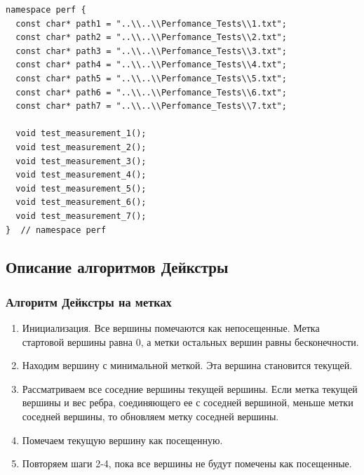 \begin{text}
\begin{lstlisting}[breaklines=true]
namespace perf {
  const char* path1 = "..\\..\\Perfomance_Tests\\1.txt";
  const char* path2 = "..\\..\\Perfomance_Tests\\2.txt";
  const char* path3 = "..\\..\\Perfomance_Tests\\3.txt";
  const char* path4 = "..\\..\\Perfomance_Tests\\4.txt";
  const char* path5 = "..\\..\\Perfomance_Tests\\5.txt";
  const char* path6 = "..\\..\\Perfomance_Tests\\6.txt";
  const char* path7 = "..\\..\\Perfomance_Tests\\7.txt";

  void test_measurement_1();
  void test_measurement_2();
  void test_measurement_3();
  void test_measurement_4();
  void test_measurement_5();
  void test_measurement_6();
  void test_measurement_7();
}  // namespace perf
\end{lstlisting}
\newpage

\subsection{Описание алгоритмов Дейкстры}
\subsubsection{Алгоритм Дейкстры на метках}
\begin{enumerate}
	\item Инициализация. Все вершины помечаются как непосещенные. Метка стартовой вершины равна 0, а метки остальных вершин равны бесконечности.
	\item Находим вершину с минимальной меткой. Эта вершина становится текущей.
	\item Рассматриваем все соседние вершины текущей вершины. Если метка текущей вершины и вес ребра, соединяющего ее с соседней вершиной, меньше метки соседней вершины, то обновляем метку соседней вершины.
	\item Помечаем текущую вершину как посещенную.
	\item Повторяем шаги 2-4, пока все вершины не будут помечены как посещенные.
\end{enumerate}


\end{text}
